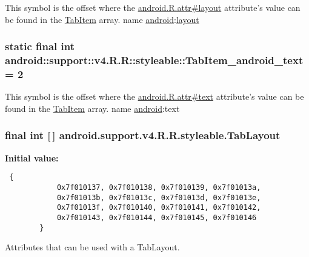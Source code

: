 This symbol is the offset where the \hyperlink{}{android.R.attr\#layout} attribute's value can be found in the \hyperlink{classandroid_1_1support_1_1v4_1_1_r_1_1styleable_91eab1ea34174d58d08c76c2c097a4b4}{TabItem} array.  name \hyperlink{namespaceandroid}{android}:\hyperlink{classandroid_1_1support_1_1v4_1_1_r_1_1layout}{layout} \hypertarget{classandroid_1_1support_1_1v4_1_1_r_1_1styleable_babc8d1758b634fdce812a00987ed3f8}{
\subsubsection[{TabItem\_\-android\_\-text}]{\setlength{\rightskip}{0pt plus 5cm}static final int android::support::v4.R.R::styleable::TabItem\_\-android\_\-text = 2}}
\label{classandroid_1_1support_1_1v4_1_1_r_1_1styleable_babc8d1758b634fdce812a00987ed3f8}


This symbol is the offset where the \hyperlink{}{android.R.attr\#text} attribute's value can be found in the \hyperlink{classandroid_1_1support_1_1v4_1_1_r_1_1styleable_91eab1ea34174d58d08c76c2c097a4b4}{TabItem} array.  name \hyperlink{namespaceandroid}{android}:text \hypertarget{classandroid_1_1support_1_1v4_1_1_r_1_1styleable_d1f1104cdc4fac0ab4797d48f7efe351}{
\subsubsection[{TabLayout}]{\setlength{\rightskip}{0pt plus 5cm}final int \mbox{[}$\,$\mbox{]} android.support.v4.R.R.styleable.TabLayout}}
\label{classandroid_1_1support_1_1v4_1_1_r_1_1styleable_d1f1104cdc4fac0ab4797d48f7efe351}


\textbf{Initial value:}

\begin{Code}\begin{verbatim} {
            0x7f010137, 0x7f010138, 0x7f010139, 0x7f01013a,
            0x7f01013b, 0x7f01013c, 0x7f01013d, 0x7f01013e,
            0x7f01013f, 0x7f010140, 0x7f010141, 0x7f010142,
            0x7f010143, 0x7f010144, 0x7f010145, 0x7f010146
        }
\end{verbatim}
\end{Code}
Attributes that can be used with a TabLayout. 

